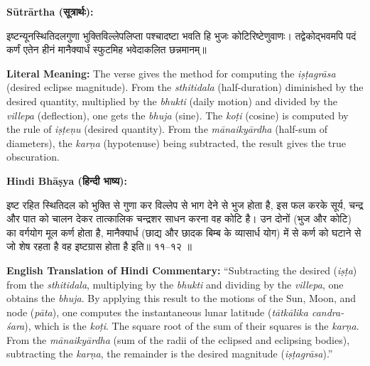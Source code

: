 \documentclass[11pt,a4paper]{article}
\newcommand{\dev}[1]{{\devanagarifont #1}}
\newenvironment{sanskritverse}{%
  \begin{center}\begin{minipage}{0.95\textwidth}
  \setlength{\leftskip}{1em}
  \setlength{\rightskip}{1em}
  \dev
}{\end{minipage}\end{center}}
\newenvironment{paracol}[1]{\begingroup}{\endgroup}
\newcommand{\switchcolumn}[1][]{%
  \ifnum#1=0\relax\else\par\nobreak\vspace{0.5em}\par\nobreak\fi%
}
\begin{document}
\vspace{0.5em}

\begin{paracol}{2}

\noindent\textbf{Sūtrārtha (\dev{सूत्रार्थः}):}
\begin{sanskritverse}
इष्टन्यूनस्थितिदलगुणा भुक्तिविल्लेपलिप्ता पश्चादष्टा भवति हि भुजः कोटिरिष्टेणुवाणः।
तद्वेकोद्भवमपि पदं कर्णं एतेन हीनं मानैक्यार्धं स्फुटमिह भवेदाकलित छन्नमानम्॥
\end{sanskritverse}

\switchcolumn

\textbf{Literal Meaning:} The verse gives the method for computing the \textit{iṣṭagrāsa} (desired eclipse magnitude). From the \textit{sthitidala} (half-duration) diminished by the desired quantity, multiplied by the \textit{bhukti} (daily motion) and divided by the \textit{villepa} (deflection), one gets the \textit{bhuja} (sine). The \textit{koṭi} (cosine) is computed by the rule of \textit{iṣṭeṇu} (desired quantity). From the \textit{mānaikyārdha} (half-sum of diameters), the \textit{karṇa} (hypotenuse) being subtracted, the result gives the true obscuration.

\end{paracol}

\vspace{0.5em}

\begin{paracol}{2}

\noindent\textbf{Hindi Bhāṣya (\dev{हिन्दी भाष्य}):}
\begin{sanskritverse}
इष्ट रहित स्थितिदल को भुक्ति से गुणा कर विल्लेप से भाग देने से भुज होता है, इस फल करके
सूर्य, चन्द्र और पात को चालन देकर तात्कालिक चन्द्रशर साधन करना वह कोटि है। उन दोनों
(भुज और कोटि) का वर्गयोग मूल कर्ण होता है, मानैक्यार्ध (छाद्य और छादक बिम्ब के व्यासार्ध
योग) में से कर्ण को घटाने से जो शेष रहता है वह इष्टग्रास होता है इति॥ ११--१२ ॥
\end{sanskritverse}

\switchcolumn

\textbf{English Translation of Hindi Commentary:} ``Subtracting the desired (\textit{iṣṭa}) from the \textit{sthitidala}, multiplying by the \textit{bhukti} and dividing by the \textit{villepa}, one obtains the \textit{bhuja}. By applying this result to the motions of the Sun, Moon, and node (\textit{pāta}), one computes the instantaneous lunar latitude (\textit{tātkālika candra-śara}), which is the \textit{koṭi}. The square root of the sum of their squares is the \textit{karṇa}. From the \textit{mānaikyārdha} (sum of the radii of the eclipsed and eclipsing bodies), subtracting the \textit{karṇa}, the remainder is the desired magnitude (\textit{iṣṭagrāsa}).''

\end{paracol}
\end{document}
